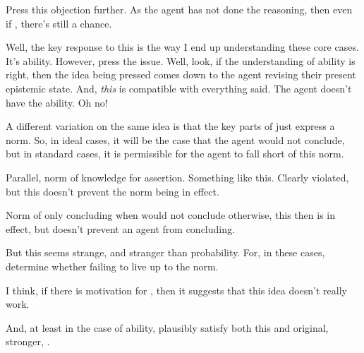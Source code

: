 \begin{note}
  Press this objection further.
  As the agent has not done the reasoning, then even if , there's still a chance.

  Well, the key response to this is the way I end up understanding these core cases.
  It's ability.
  However, press the issue.
  Well, look, if the understanding of ability is right, then the idea being pressed comes down to the agent revising their present epistemic state.
  And, \emph{this} is compatible with everything said.
  The agent doesn't have the ability.
  Oh no!
\end{note}

\begin{note}
  A different variation on the same idea is that the key parts of \zS{} just express a norm.
  So, in ideal cases, it will be the case that the agent would not conclude, but in standard cases, it is permissible for the agent to fall short of this norm.

  Parallel, norm of knowledge for assertion.
  Something like this.
  Clearly violated, but this doesn't prevent the norm being in effect.

  Norm of only concluding when would not conclude otherwise, this then is in effect, but doesn't prevent an agent from concluding.

  But this seems strange, and stranger than probability.
  For, in these cases, determine whether failing to live up to the norm.

  I think, if there is motivation for \zS{}, then it suggests that this idea doesn't really work.

  And, at least in the case of ability, plausibly satisfy both this and original, stronger, \qzS{}.
\end{note}



